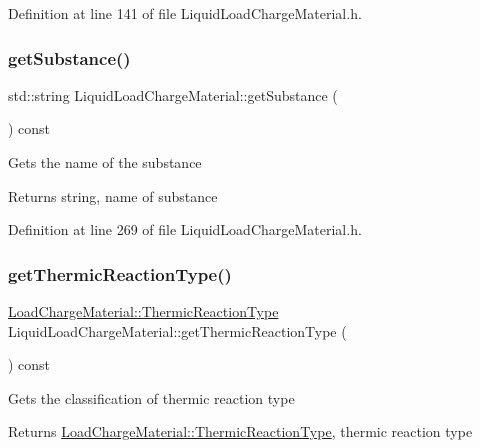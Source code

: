 Definition at line 141 of file Liquid\+Load\+Charge\+Material.\+h.

\mbox{\label{class_liquid_load_charge_material_a8f925c04c15ed889ba3fd7c4b628dbff}} 
\subsubsection{\texorpdfstring{get\+Substance()}{getSubstance()}}
{\footnotesize\ttfamily std\+::string Liquid\+Load\+Charge\+Material\+::get\+Substance (\begin{DoxyParamCaption}{ }\end{DoxyParamCaption}) const\hspace{0.3cm}{\ttfamily [inline]}}

Gets the name of the substance \begin{DoxyReturn}{Returns}
string, name of substance 
\end{DoxyReturn}


Definition at line 269 of file Liquid\+Load\+Charge\+Material.\+h.

\mbox{\label{class_liquid_load_charge_material_a181337f5e5cf6a47b82dd56897b49c29}} 
\subsubsection{\texorpdfstring{get\+Thermic\+Reaction\+Type()}{getThermicReactionType()}}
{\footnotesize\ttfamily \hyperlink{namespace_load_charge_material_a51d4263e865a5d86236622dd3fe23fd1}{Load\+Charge\+Material\+::\+Thermic\+Reaction\+Type} Liquid\+Load\+Charge\+Material\+::get\+Thermic\+Reaction\+Type (\begin{DoxyParamCaption}{ }\end{DoxyParamCaption}) const\hspace{0.3cm}{\ttfamily [inline]}}

Gets the classification of thermic reaction type \begin{DoxyReturn}{Returns}
\hyperlink{namespace_load_charge_material_a51d4263e865a5d86236622dd3fe23fd1}{Load\+Charge\+Material\+::\+Thermic\+Reaction\+Type}, thermic reaction type 
\end{DoxyReturn}


